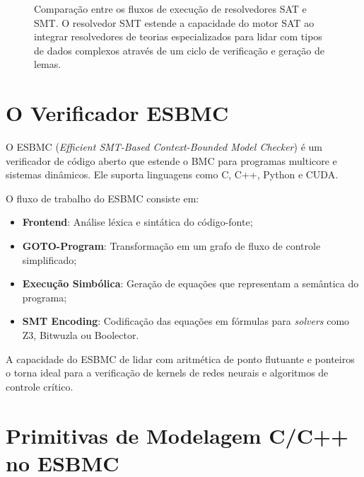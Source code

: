 \begin{figure}[htb]
\caption{Comparação entre os fluxos de execução de resolvedores SAT e SMT. O resolvedor SMT estende a capacidade do motor SAT ao integrar resolvedores de teorias especializados para lidar com tipos de dados complexos através de um ciclo de verificação e geração de lemas.}
\label{fig:sat_smt}
\end{figure}

\section{O Verificador ESBMC}

O ESBMC (\textit{Efficient SMT-Based Context-Bounded Model Checker}) é um verificador de código aberto que estende o BMC para programas multicore e sistemas dinâmicos. Ele suporta linguagens como C, C++, Python e CUDA. 

O fluxo de trabalho do ESBMC consiste em:
\begin{itemize}
    \item \textbf{Frontend}: Análise léxica e sintática do código-fonte;
    \item \textbf{GOTO-Program}: Transformação em um grafo de fluxo de controle simplificado;
    \item \textbf{Execução Simbólica}: Geração de equações que representam a semântica do programa;
    \item \textbf{SMT Encoding}: Codificação das equações em fórmulas para \textit{solvers} como Z3, Bitwuzla ou Boolector.
\end{itemize}

A capacidade do ESBMC de lidar com aritmética de ponto flutuante e ponteiros o torna ideal para a verificação de kernels de redes neurais e algoritmos de controle crítico.

\section{Primitivas de Modelagem C/C++ no ESBMC}

